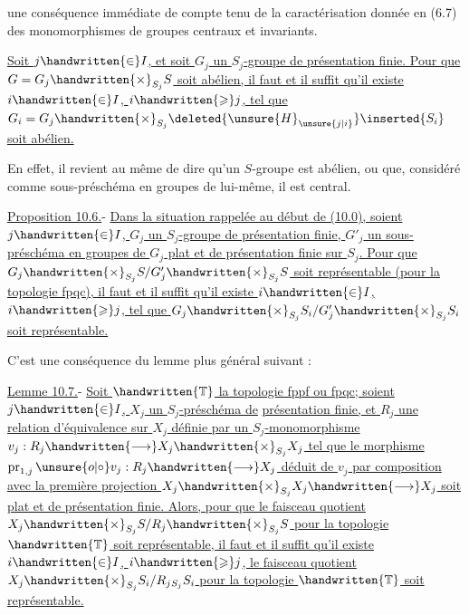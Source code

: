  une conséquence immédiate de  compte tenu de la caractérisation donnée en (6.7) des monomorphismes de groupes centraux et invariants.

  \uline{Soit $j\handwritten{\in}I$, et soit $G_j$ un $S_j$-groupe de présentation finie. Pour que $G=G_j\handwritten{\times}_{S_j}S$ soit abélien, il faut et il suffit qu'il existe $i\handwritten{\in}I$, $i\handwritten{\geqslant}j$, tel que $G_i=G_j\handwritten{\times}_{S_j}\deleted{\unsure{H}_{\unsure{j|i}}}\inserted{S_i}$ soit abélien.}

En effet, il revient au même de dire qu'un $S$-groupe est abélien, ou que, considéré comme sous-préschéma en groupes de lui-même, il est central.

\uline{Proposition 10.6.}- \uline{Dans la situation rappelée au début de (10.0), soient $j\handwritten{\in}I$, $G_j$ un $S_j$-groupe de présentation finie, $G'_j$ un sous-préschéma en groupes de $G_j$ plat et de présentation finie sur $S_j$. Pour que $G_j\handwritten{\times}_{S_j}S/G'_j\handwritten{\times}_{S_j}S$ soit représentable (pour la topologie fpqc), il faut et il suffit qu'il existe $i\handwritten{\in}I$, $i\handwritten{\geqslant}j$, tel que $G_j\handwritten{\times}_{S_j}S_i/G'_j\handwritten{\times}_{S_j}S_i$ soit représentable.}

C'est une conséquence du lemme plus général suivant :

\uline{Lemme 10.7.}- \uline{Soit $\handwritten{\mathbb{T}}$ la topologie fppf ou fpqc; soient $j\handwritten{\in}I$, $X_j$ un $S_j$-préschéma de}
\uline{présentation finie, et $R_j$ une relation d'équivalence sur $X_j$ définie par un $S_j$-monomorphisme $v_j:R_j\handwritten{\longrightarrow}X_j\handwritten{\times}_{S_j}X_j$ tel que le morphisme $\operatorname{pr}_{1,j}\mathbin{\unsure{o|\circ}} v_j:R_j\handwritten{\longrightarrow}X_j$ déduit de $v_j$ par composition avec la première projection $X_j\handwritten{\times}_{S_j}X_j\handwritten{\longrightarrow}X_j$ soit plat et de présentation finie. Alors, pour que le faisceau quotient $X_j\handwritten{\times}_{S_j}S/R_j\handwritten{\times}_{S_j}S$ pour la topologie $\handwritten{\mathbb{T}}$ soit représentable, il faut et il suffit qu'il existe $i\handwritten{\in}I$, $i\handwritten{\geqslant}j$, le faisceau quotient $X_j\handwritten{\times}_{S_j}S_i/R_j{}_{S_j}S_i$ pour la topologie $\handwritten{\mathbb{T}}$ soit représentable.}

